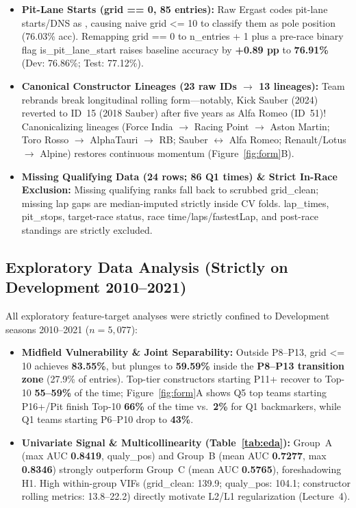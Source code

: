 \documentclass[10pt,a4paper,twocolumn]{article}
\newcommand{\code}[1]{{\fontsize{8.5pt}{10pt}\selectfont\ttfamily #1}}
\newcommand{\ub}{\_\allowbreak{}}
\begin{document}
\begin{itemize}
  \item \textbf{Pit-Lane Starts (\code{grid == 0}, 85 entries):} Raw Ergast codes pit-lane starts/DNS as \code{0}, causing naive \code{grid <= 10} to classify them as pole position (76.03\% acc). Remapping \code{grid == 0} to \code{n\ub entries + 1} plus a pre-race binary flag \code{is\ub pit\ub lane\ub start} raises baseline accuracy by \textbf{+0.89 pp} to \textbf{76.91\%} (Dev: 76.86\%; Test: 77.12\%).
  \item \textbf{Canonical Constructor Lineages (23 raw IDs $\rightarrow$ 13 lineages):} Team rebrands break longitudinal rolling form---notably, Kick Sauber (2024) reverted to ID~15 (2018 Sauber) after five years as Alfa Romeo (ID~51)! Canonicalizing lineages (Force India $\rightarrow$ Racing Point $\rightarrow$ Aston Martin; Toro Rosso $\rightarrow$ AlphaTauri $\rightarrow$ RB; Sauber $\leftrightarrow$ Alfa Romeo; Renault/Lotus $\rightarrow$ Alpine) restores continuous momentum (Figure~\ref{fig:form}B).
  \item \textbf{Missing Qualifying Data (24 rows; 86 Q1 times) \& Strict In-Race Exclusion:} Missing qualifying ranks fall back to scrubbed \code{grid\ub clean}; missing lap gaps are median-imputed strictly inside CV folds. \code{lap\ub times}, \code{pit\ub stops}, target-race \code{status}, race \code{time}/\code{laps}/\code{fastestLap}, and post-race standings are strictly excluded.
\end{itemize}

\subsection{Exploratory Data Analysis (Strictly on Development 2010--2021)}
All exploratory feature-target analyses were strictly confined to Development seasons 2010--2021 ($n=5{,}077$):
\begin{itemize}
  \item \textbf{Midfield Vulnerability \& Joint Separability:} Outside P8--P13, \code{grid <= 10} achieves \textbf{83.55\%}, but plunges to \textbf{59.59\%} inside the \textbf{P8--P13 transition zone} (27.9\% of entries). Top-tier constructors starting P11+ recover to Top-10 \textbf{55--59\%} of the time; Figure~\ref{fig:form}A shows Q5 top teams starting P16+/Pit finish Top-10 \textbf{66\%} of the time vs.\ \textbf{2\%} for Q1 backmarkers, while Q1 teams starting P6--P10 drop to \textbf{43\%}.
  \item \textbf{Univariate Signal \& Multicollinearity (Table~\ref{tab:eda}):} Group~A (max AUC \textbf{0.8419}, \code{qualy\ub pos}) and Group~B (mean AUC \textbf{0.7277}, max \textbf{0.8346}) strongly outperform Group~C (mean AUC \textbf{0.5765}), foreshadowing H1. High within-group VIFs (\code{grid\ub clean}: 139.9; \code{qualy\ub pos}: 104.1; constructor rolling metrics: 13.8--22.2) directly motivate L2/L1 regularization (Lecture~4).
\end{itemize}
\end{document}
